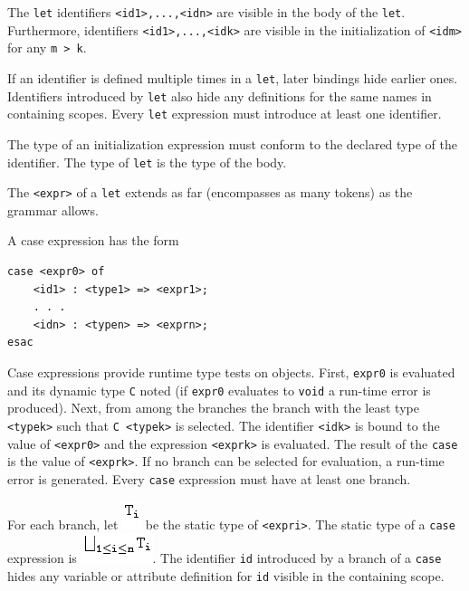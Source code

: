 \documentclass[]{article}
\begin{document}
The \texttt{let} identifiers
\texttt{\textless{}id1\textgreater{},...,\textless{}idn\textgreater{}}
are visible in the body of the \texttt{let}. Furthermore, identifiers
\texttt{\textless{}id1\textgreater{},...,\textless{}idk\textgreater{}}
are visible in the initialization of
\texttt{\textless{}idm\textgreater{}} for any
\texttt{m \textgreater{} k}.

If an identifier is defined multiple times in a \texttt{let}, later
bindings hide earlier ones. Identifiers introduced by \texttt{let} also
hide any definitions for the same names in containing scopes. Every
\texttt{let} expression must introduce at least one identifier.

The type of an initialization expression must conform to the declared
type of the identifier. The type of \texttt{let} is the type of the
body.

The \texttt{\textless{}expr\textgreater{}} of a \texttt{let} extends as
far (encompasses as many tokens) as the grammar allows.

A case expression has the form

\begin{verbatim}
case <expr0> of 
    <id1> : <type1> => <expr1>; 
    . . .
    <idn> : <typen> => <exprn>; 
esac
\end{verbatim}

Case expressions provide runtime type tests on objects. First,
\texttt{expr0} is evaluated and its dynamic type \texttt{C} noted (if
\texttt{expr0} evaluates to \texttt{void} a run-time error is produced).
Next, from among the branches the branch with the least type
\texttt{\textless{}typek\textgreater{}} such that
\texttt{C  \textless{}typek\textgreater{}} is selected. The identifier
\texttt{\textless{}idk\textgreater{}} is bound to the value of
\texttt{\textless{}expr0\textgreater{}} and the expression
\texttt{\textless{}exprk\textgreater{}} is evaluated. The result of the
\texttt{case} is the value of \texttt{\textless{}exprk\textgreater{}}.
If no branch can be selected for evaluation, a run-time error is
generated. Every \texttt{case} expression must have at least one branch.

For each branch, let \includegraphics{img25.png} be the static type of
\texttt{\textless{}expri\textgreater{}}. The static type of a
\texttt{case} expression is \includegraphics{img26.png}. The identifier
\texttt{id} introduced by a branch of a \texttt{case} hides any variable
or attribute definition for \texttt{id} visible in the containing scope.
\end{document}
